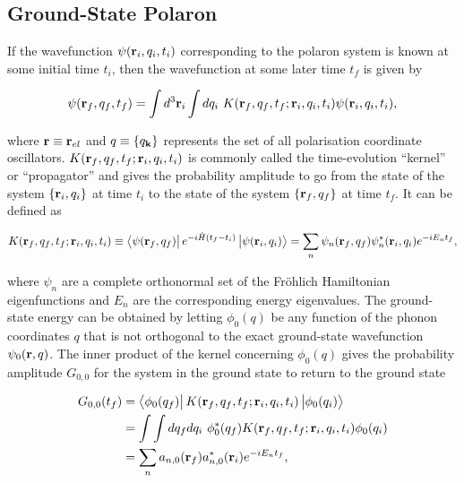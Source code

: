 \subsection{Ground-State Polaron}
\label{subsec:2-2-1}

If the wavefunction $\psi(\vb{r}_{i}, q_i, t_i)$ corresponding to the polaron system is known at some initial time $t_{i}$, then the wavefunction at some later time $t_f$ is given by

\begin{equation}
    \psi(\vb{r}_{f}, q_{f}, t_f) = \int d^3\vb{r}_{i} \int dq_i\ K(\vb{r}_{f}, q_f, t_f; \vb{r}_{i}, q_i, t_i) \psi(\vb{r}_{i}, q_i, t_i),
\end{equation}

where $\vb{r} \equiv \vb{r}_{el}$ and $q \equiv \{q_{\vb{k}}\}$ represents the set of all polarisation coordinate oscillators. $K(\vb{r}_{f}, q_f, t_f; \vb{r}_{i}, q_i, t_i)$ is commonly called the time-evolution ``kernel'' or ``propagator'' and gives the probability amplitude to go from the state of the system $\{\vb{r}_{i}, q_i\}$ at time $t_i$ to the state of the system $\{\vb{r}_{f}, q_f\}$ at time $t_f$. It can be defined as

\begin{equation}
    K(\vb{r}_{f}, q_f, t_f; \vb{r}_{i}, q_i, t_i) \equiv \bra{\psi(\vb{r}_f, q_f)} e^{-i\hat{H}(t_f - t_i)} \ket{\psi(\vb{r}_i, q_i)} = \sum_n \psi_n(\vb{r}_f, q_f) \psi_n^*(\vb{r}_i, q_i) e^{-i E_n t_f},
\end{equation}

where $\psi_n$ are a complete orthonormal set of the Fr\"ohlich Hamiltonian eigenfunctions and $E_n$ are the corresponding energy eigenvalues. The ground-state energy can be obtained by letting $\phi_0(q)$ be any function of the phonon coordinates $q$ that is not orthogonal to the exact ground-state wavefunction $\psi_0(\vb{r}, q)$. The inner product of the kernel concerning $\phi_0(q)$ gives the probability amplitude $G_{0,0}$ for the system in the ground state to return to the ground state 

\begin{equation}
\begin{aligned}
    G_{0,0}(t_f) &= \bra{\phi_0(q_f)} K(\vb{r}_{f}, q_f, t_f; \vb{r}_{i}, q_i, t_i) \ket{\phi_0(q_i)} \\
    &= \int\int dq_f dq_i\ \phi_0^*(q_f) K(\vb{r}_{f}, q_f, t_f; \vb{r}_{i}, q_i, t_i) \phi_0(q_i) \\
    &= \sum_n a_{n,0}(\vb{r}_f) a^*_{n,0}(\vb{r}_i) e^{-i E_n t_f},
\end{aligned}
\end{equation}

